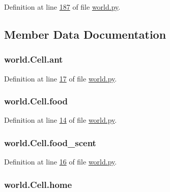 Definition at line \hyperlink{world_8py_source_l00187}{187} of file \hyperlink{world_8py_source}{world.\+py}.



\subsection{Member Data Documentation}
\hypertarget{classworld_1_1Cell_abfd9b278ac86f77970b7766a7c2e3231}{
\subsubsection[{ant}]{\setlength{\rightskip}{0pt plus 5cm}world.\+Cell.\+ant}}\label{classworld_1_1Cell_abfd9b278ac86f77970b7766a7c2e3231}


Definition at line \hyperlink{world_8py_source_l00017}{17} of file \hyperlink{world_8py_source}{world.\+py}.

\hypertarget{classworld_1_1Cell_a401fde7236825c1843dad8764c2fb4a8}{
\subsubsection[{food}]{\setlength{\rightskip}{0pt plus 5cm}world.\+Cell.\+food}}\label{classworld_1_1Cell_a401fde7236825c1843dad8764c2fb4a8}


Definition at line \hyperlink{world_8py_source_l00014}{14} of file \hyperlink{world_8py_source}{world.\+py}.

\hypertarget{classworld_1_1Cell_acec0cb9d8a7eb92bedf71dc57641efbe}{
\subsubsection[{food\+\_\+scent}]{\setlength{\rightskip}{0pt plus 5cm}world.\+Cell.\+food\+\_\+scent}}\label{classworld_1_1Cell_acec0cb9d8a7eb92bedf71dc57641efbe}


Definition at line \hyperlink{world_8py_source_l00016}{16} of file \hyperlink{world_8py_source}{world.\+py}.

\hypertarget{classworld_1_1Cell_a9baf3378be8090bf1faf1b19b9aa5fd3}{
\subsubsection[{home}]{\setlength{\rightskip}{0pt plus 5cm}world.\+Cell.\+home}}\label{classworld_1_1Cell_a9baf3378be8090bf1faf1b19b9aa5fd3}


